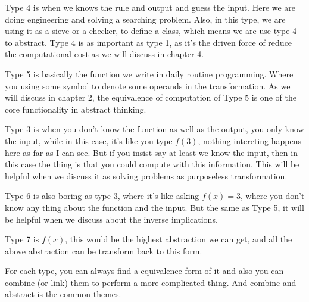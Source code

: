 Type 4 is when we knows the rule and output and guess the input. Here we are doing engineering and solving a searching problem. Also, in this type, we are using it as a sieve or a checker, to define a class, which means we are use type 4 to abstract. Type 4 is as important as type 1, as it's the driven force of reduce the computational cost as we will discuss in chapter 4.

Type 5 is basically the function we write in daily routine programming. Where you using some symbol to denote some operands in the transformation. As we will discuss in chapter 2, the equivalence of computation of Type 5 is one of the core functionality in abstract thinking.

Type 3 is when you don't know the function as well as the output, you only know the input, while in this case, it's like you type $f(3)$, nothing intereting happens here as far as I can see. But if you insist say at least we know the input, then in this case the thing is that you could compute with this information. This will be helpful when we discuss it as solving problems as purposeless transformation.

Type 6 is also boring as type 3, where it's like asking $f(x) = 3$, where you don't know any thing about the function and the input. But the same as Type 5, it will be helpful when we discuss about the inverse implications.

Type 7 is $f(x)$, this would be the highest abstraction we can get, and all the above abstraction can be transform back to this form.

For each type, you can always find a equivalence form of it and also you can combine (or link) them to perform a more complicated thing. And combine and abstract is the common themes.


